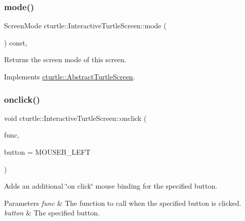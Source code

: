 \subsubsection{\texorpdfstring{mode()}{mode()}\hspace{0.1cm}{\footnotesize\ttfamily [2/2]}}
{\footnotesize\ttfamily Screen\+Mode cturtle\+::\+Interactive\+Turtle\+Screen\+::mode (\begin{DoxyParamCaption}{ }\end{DoxyParamCaption}) const\hspace{0.3cm}{\ttfamily [inline]}, {\ttfamily [virtual]}}

Returns the screen mode of this screen. 

Implements \hyperlink{classcturtle_1_1AbstractTurtleScreen}{cturtle\+::\+Abstract\+Turtle\+Screen}.

\mbox{\label{classcturtle_1_1InteractiveTurtleScreen_a05410a8f835e296f8ffca90ca3b0da24}} 
\subsubsection{\texorpdfstring{onclick()}{onclick()}}
{\footnotesize\ttfamily void cturtle\+::\+Interactive\+Turtle\+Screen\+::onclick (\begin{DoxyParamCaption}\item[{Mouse\+Func}]{func,  }\item[{Mouse\+Button}]{button = {\ttfamily MOUSEB\+\_\+LEFT} }\end{DoxyParamCaption})\hspace{0.3cm}{\ttfamily [inline]}}



Adds an additional \char`\"{}on click\char`\"{} mouse binding for the specified button. 


\begin{DoxyParams}{Parameters}
{\em func} & The function to call when the specified button is clicked. \\
\hline
{\em button} & The specified button. \\
\hline
\end{DoxyParams}
\mbox{\label{classcturtle_1_1InteractiveTurtleScreen_a997c82f379c6c90e2f1d2336db8bc1fc}} 
